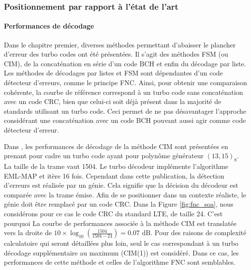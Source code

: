 \subsubsection{Positionnement par rapport à l'état de l'art}
\paragraph*{Performances de décodage}
Dans le chapitre premier, diverses méthodes permettant d'abaisser le plancher d'erreur des turbo codes ont été présentées.
Il s'agit des méthodes FSM (ou CIM), de la concaténation en série d'un code BCH et enfin du décodage par liste. 
Les méthodes de décodages par listes et FSM sont dépendantes d'un code détecteur d'erreurs, comme le principe FNC. Ainsi, 
pour obtenir une comparaison cohérente, la courbe de référence correspond à un turbo code 
sans concaténation avec un code CRC, bien que celui-ci soit déjà présent dans la majorité de standards utilisant un turbo code. 
Ceci permet de ne pas désavantager l'approche considérant une concaténation avec un code BCH pouvant aussi agir comme 
code détecteur d'erreur.

Dans \cite{cim}, les performances de décodage de la méthode CIM sont présentées en prenant pour cadre un turbo code ayant pour
polynôme générateur $(13,15)_8$. La taille de la trame vaut 1504. Le turbo décodeur implémente l'algorithme EML-MAP et
itère 16 fois. Cependant dans cette publication, la détection d'erreurs est réalisée par un génie. Cela signifie
que la décision du décodeur est comparée avec la trame émise. Afin de se positionner dans un contexte réaliste, le génie doit être remplacé
par un code CRC. Dans la Figure \ref{fig:fnc_soa}, nous considérons pour ce cas le code CRC du standard LTE, de taille 24.
C'est pourquoi La courbe de performances associée à la méthode CIM est translatée vers la droite de $10\times\log_{10}\left(\frac{1504}{1504-24}\right)=0.07\text{ dB}$.
Pour des raisons de complexité calculatoire qui seront détaillées plus loin, seul le cas correspondant à un 
turbo décodage supplémentaire au maximum (CIM(1)) est considéré. Dans ce cas, les performances de cette méthode et celles de l'algorithme
FNC sont semblables.

